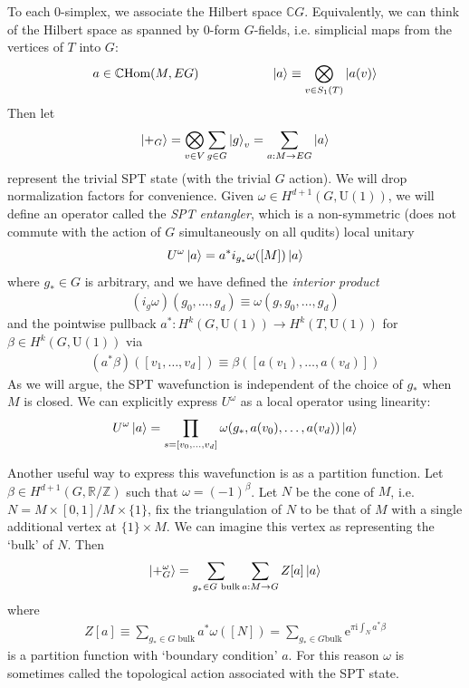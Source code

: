 \documentclass{article}
\theoremstyle{definition}
\theoremstyle{definition}
\newcommand{\Z}{\mathbb Z}
\newcommand{\R}{\mathbb R}
\newcommand{\Hom}{\text{Hom}}
\newcommand{\U}{\mathrm{U}}
\newcommand{\C}{\mathbb{C}}
\newcommand{\e}{\mathrm{e}}
\newcommand{\ii}{\mathrm{i}}
\begin{document}
To each 0-simplex, we associate the Hilbert space $\C G$. Equivalently, we can
think of the Hilbert space as spanned by 0-form $G$-fields, i.e. simplicial maps
from the vertices of $T$ into $G$:
\begin{align}
  a \in \mathbb C \Hom(M, EG) \hspace{2cm} \ket{a} \equiv \bigotimes_{v \in S_1(T)}\ket{a(v)}
\end{align}
Then let
\begin{align}\label{eq:trivial-SPT-definition}
\ket{+_G} = \bigotimes_{v \in V} \sum_{g \in G}\ket{g}_{v} = \sum_{a: M \to EG}\ket{a}
\end{align}
represent the trivial SPT state (with the trivial $G$ action). We will drop normalization factors for
convenience.
Given $\omega \in H^{d+1}(G, \U(1))$, we will define an operator
called the \textit{SPT entangler}, which is a non-symmetric (does not commute
with the action of $G$ simultaneously on all qudits) local unitary
\begin{equation}\label{eq:SPT-entangler-definition}
  U^\omega\ket{a} = a^* i_{g_*}\omega([M])\ket{a}
\end{equation}
where $g_* \in G$ is arbitrary, and we have defined the \textit{interior product}
\begin{align}\label{eq:interior-product-definition}
  (i_g\omega)(g_0, \dots, g_d)\equiv \omega(g, g_0, \dots, g_d)
\end{align}
and the pointwise pullback $a^*:H^k(G, \U(1)) \to H^k(T, \U(1))$
for $\beta \in H^k(G, \U(1))$ via
\begin{align}\label{eq:pointwise-pullback-definition}
  (a^* \beta)([v_1, \dots, v_d]) \equiv  \beta([a(v_1), \dots, a(v_d)])
\end{align}
As we will argue, the SPT wavefunction is independent of the choice of $g_*$
when $M$ is closed.
We can explicitly express $U^\omega$ as a local operator using linearity:
\begin{align}\label{eq:SPT-entangler-is-local}
U^\omega \ket{a} = \prod_{s = [v_0, \dots, v_d]}\omega(g_*, a(v_0), \ldots, a(v_d))\ket{a}
\end{align}

Another useful way to express this wavefunction is as a partition function.
Let $\beta \in H^{d+1}(G, \R/\Z)$ such that $\omega = (-1)^\beta$. 
Let $N$ be the cone of $M$, i.e. $N = M \times [0,1]/M \times \{1\}$, fix the
triangulation of $N$ to be that of $M$ with a single additional vertex at $\{1\}
\times M$. We can imagine this vertex as representing the `bulk' of $N$. Then
\begin{align}\label{eq:SPT-statesum-definition}
  \ket{+^\omega_G} = \sum_{g_* \in G \text{ bulk}} \sum_{a:M \to G}Z[a]\ket{a}
\end{align}
where
\begin{align}\label{eq:SPT-partition-function-defintion}
  Z[a] \equiv \sum_{g_* \in G \text{ bulk}} a^* \omega([N]) = \sum_{g_* \in G \text{bulk}}\e^{\pi \ii\int_{N}a^* \beta}
\end{align}
is a partition function with `boundary condition' $a$. For this reason $\omega$
is sometimes called the topological action associated with the SPT state.
\end{document}
